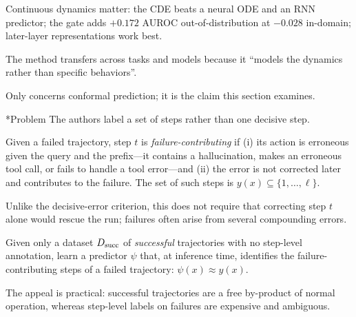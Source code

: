 \documentclass[11pt]{article}
\makeatletter
\theoremstyle{definition}
\renewcommand\subsection{\@startsection{subsection}{2}{\z@}{-3.25ex\@plus -1ex \@minus -.2ex}{1.5ex \@plus .2ex}{\normalfont\large\bfseries\color{secblue}}}
\makeatother
\begin{document}
\begin{claimbox}
\begin{description}[leftmargin=2.6em,labelwidth=2.1em,labelsep=0.5em,itemsep=2pt,topsep=4pt]
\item[\ctag{O7}]  Continuous dynamics matter: the CDE beats a neural ODE and an RNN predictor; the gate adds $+0.172$ AUROC out-of-distribution at $-0.028$ in-domain; later-layer representations work best.
\item[\ctag{O8}]  The method transfers across tasks and models because it ``models the dynamics rather than specific behaviors''.
\end{description}
Only  concerns conformal prediction; it is the claim this section examines.
\end{claimbox}

\subsection*{Problem}
The authors label a set of steps rather than one decisive step.
\begin{definition}\label{def:fcs}
Given a failed trajectory, step $t$ is \emph{failure-contributing} if (i) its action is erroneous given the query and the prefix---it contains a hallucination, makes an erroneous tool call, or fails to handle a tool error---and (ii) the error is not corrected later and contributes to the failure. The set of such steps is $y(x)\subseteq\{1,\dots,\ell\}$.
\end{definition}
Unlike the decisive-error criterion, this does not require that correcting step $t$ alone would rescue the run; failures often arise from several compounding errors.
\begin{definition}
Given only a dataset $D_{\rm succ}$ of \emph{successful} trajectories with no step-level annotation, learn a predictor $\psi$ that, at inference time, identifies the failure-contributing steps of a failed trajectory: $\psi(x)\approx y(x)$.
\end{definition}
The appeal is practical: successful trajectories are a free by-product of normal operation, whereas step-level labels on failures are expensive and ambiguous.
\end{document}
